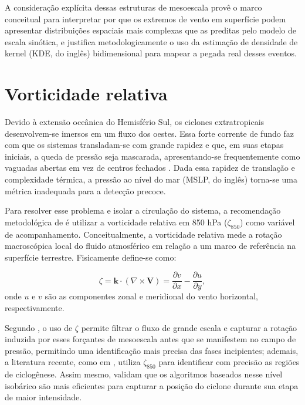A consideração explícita dessas estruturas de mesoescala provê o marco conceitual para interpretar por que os extremos de vento em superfície podem apresentar distribuições espaciais mais complexas que as preditas pelo modelo de escala sinótica, e justifica metodologicamente o uso da estimação de densidade de kernel (KDE, do inglês) bidimensional para mapear a pegada real desses eventos.


\section{Vorticidade relativa}\label{sec:tb_vorticidad}

Devido à extensão oceânica do Hemisfério Sul, os ciclones extratropicais desenvolvem-se imersos em um fluxo dos oestes. Essa forte corrente de fundo faz com que os sistemas transladam-se com grande rapidez e que, em suas etapas iniciais, a queda de pressão seja mascarada, apresentando-se frequentemente como vaguadas abertas em vez de centros fechados \citep{sinclair1994objective}. Dada essa rapidez de translação e complexidade térmica, a pressão ao nível do mar (MSLP, do inglês) torna-se uma métrica inadequada para a detecção precoce. 

Para resolver esse problema e isolar a circulação do sistema, a recomendação metodológica de \citet{sinclair1997objective} é utilizar a vorticidade relativa em 850 hPa ($\zeta_{850}$) como variável de acompanhamento. Conceitualmente, a vorticidade relativa mede a rotação macroscópica local do fluido atmosférico em relação a um marco de referência na superfície terrestre. Fisicamente define-se como:

\begin{equation}\label{eq:vorticidad_relativa}
\zeta = \mathbf{k} \cdot (\nabla \times \mathbf{V}) = \frac{\partial v}{\partial x} - \frac{\partial u}{\partial y},
\end{equation}
onde $u$ e $v$ são as componentes zonal e meridional do vento horizontal, respectivamente.

Segundo \citet{hoskins2005new}, o uso de $\zeta$ permite filtrar o fluxo de grande escala e capturar a rotação induzida por esses forçantes de mesoescala antes que se manifestem no campo de pressão, permitindo uma identificação mais precisa das fases incipientes; ademais, a literatura recente, como em \citet{gramcianinov2019properties}, utiliza $\zeta_{850}$ para identificar com precisão as regiões de ciclogênese. Assim mesmo, \citet{padilhareinke2024objective} validam que os algoritmos baseados nesse nível isobárico são mais eficientes para capturar a posição do ciclone durante sua etapa de maior intensidade. 

